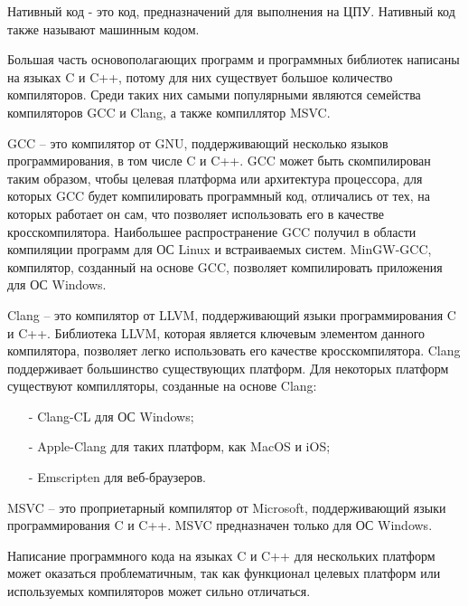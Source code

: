 Нативный код - это код, предназначений для выполнения на ЦПУ.
Нативный код также называют машинным кодом.

Большая часть основополагающих программ и программных библиотек написаны на языках C и C++, потому для них существует большое количество компиляторов.
Среди таких них самыми популярными являются семейства компиляторов GCC и Clang, а также компиллятор MSVC.

GCC -- это компилятор от GNU, поддерживающий несколько языков программирования, в том числе C и C++. 
GCC может быть скомпилирован таким образом, чтобы целевая платформа или архитектура процессора, для которых GCC будет компилировать программный код, отличались от тех, на которых работает он сам, что позволяет использовать его в качестве кросскомпилятора.
Наибольшее распространение GCC получил в области компиляции программ для ОС Linux и встраиваемых систем.
MinGW-GCC, компилятор, созданный на основе GCC, позволяет компилировать приложения для ОС Windows.

Clang -- это компилятор от LLVM, поддерживающий языки программирования C и C++.
Библиотека LLVM, которая является ключевым элементом данного компилятора, позволяет легко использовать его качестве кросскомпилятора. 
Clang поддерживает большинство существующих платформ. Для некоторых платформ существуют компилляторы, созданные на основе Clang:
\begin{itemize}
    \item[-] Clang-CL для ОС Windows;
    \item[-] Apple-Clang для таких платформ, как MacOS и iOS;
    \item[-] Emscripten для веб-браузеров.
\end{itemize}

MSVC -- это проприетарный компилятор от Microsoft, поддерживающий языки программирования C и C++. 
MSVC предназначен только для ОС Windows. 

Написание программного кода на языках C и C++ для нескольких платформ может оказаться проблематичным, так как функционал целевых платформ или используемых компиляторов может сильно отличаться.




